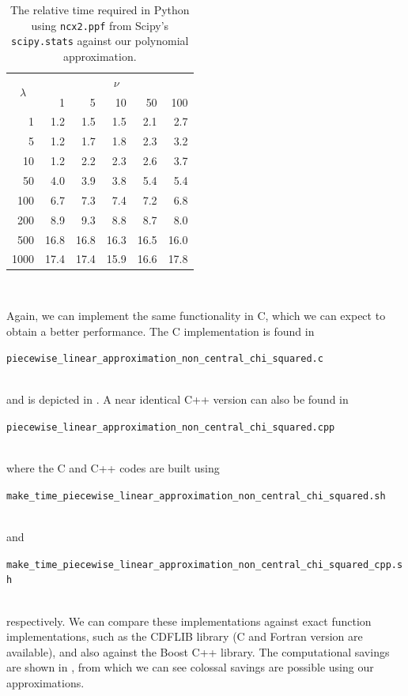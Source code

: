 \documentclass[11pt,a4paper,twoside,english]{extarticle}
\newcommand{\singlecodeline}[1]{\\[1em]\centerline{\lstinline[basicstyle=\ttfamily]$#1$}\\[1em]}
\begin{document}
\begin{table}[htb]
\centering    
\begin{tabular}{|r|rrrrr|}
\multicolumn{1}{c}{\multirow{2}{*}{$ \lambda $}} & \multicolumn{5}{c}{$ \nu $} \\
\cline{2-6}
\multicolumn{1}{c|}{} & 1 &   5  &  10 &  50  & 100 \\
\hline
   1 &  1.2 &  1.5 &  1.5 &  2.1 &  2.7 \\
   5 &  1.2 &  1.7 &  1.8 &  2.3 &  3.2 \\
  10 &  1.2 &  2.2 &  2.3 &  2.6 &  3.7 \\
  50 &  4.0 &  3.9 &  3.8 &  5.4 &  5.4 \\
 100 &  6.7 &  7.3 &  7.4 &  7.2 &  6.8 \\
 200 &  8.9 &  9.3 &  8.8 &  8.7 &  8.0 \\
 500 & 16.8 & 16.8 & 16.3 & 16.5 & 16.0 \\
1000 & 17.4 & 17.4 & 15.9 & 16.6 & 17.8 \\
\hline 
\end{tabular}\\[1em]
\caption{The relative time required in Python using \texttt{ncx2.ppf} from Scipy's \texttt{scipy.stats} against our polynomial approximation.}
\label{tab:non_central_chi_2_times_python_approximation}
\end{table}


Again, we can implement the same functionality in C, which we can expect to obtain a better performance. The C implementation is found in \singlecodeline{piecewise_linear_approximation_non_central_chi_squared.c} and is depicted in . A near identical C++ version can also be found in \singlecodeline{piecewise_linear_approximation_non_central_chi_squared.cpp} where the C and C++ codes are built using \singlecodeline{make_time_piecewise_linear_approximation_non_central_chi_squared.sh} and \singlecodeline{make_time_piecewise_linear_approximation_non_central_chi_squared_cpp.sh}
respectively. We can compare these implementations against exact function implementations, such as the CDFLIB library (C and Fortran version are available), and also against the Boost C++ library. The computational savings are shown in , from which we can see colossal savings are possible using our approximations. 
\end{document}
